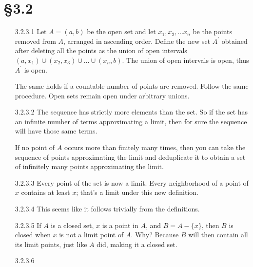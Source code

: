 \newpage
\vspace*{0.1cm}
\section*{\S 3.2}
\begin{enumerate}
\item[3.2.3.1]
  Let $A=(a, b)$ be the open set and let 
  $x_1, x_2, \ldots x_n$ be the points removed from $A$,
  arranged in ascending order. 
  Define the new set $A^\prime$ obtained
  after deleting all the points as the union of open intervals
  $(a, x_1) \cup (x_2, x_3) \cup \ldots \cup (x_n, b)$. 
  The union of open intervals is open, thus $A^\prime$ is open.

  The same holds if a countable number of points are removed. 
  Follow the same procedure. Open sets remain open under arbitrary unions. 
\item[]
\item[3.2.3.2]
  The sequence has strictly more elements than the set. 
  So if the set has an infinite number of terms approximating a limit, 
  then for sure the sequence will have those same terms.

  If no point of $A$ occurs more than finitely many times, 
  then you can take the sequence of points approximating the limit and
  deduplicate it to obtain a set of infinitely many points 
  approximating the limit. 
\item[]
\item[3.2.3.3]
  Every point of the set is now a limit. Every neighborhood of a point of $x$
  contains at least $x$; that's a limit under this new definition.
\item[]
\item[3.2.3.4]
  This seems like it follows trivially from the definitions. 
\item[]
\item[3.2.3.5]
  If $A$ is a closed set, $x$ is a point in $A$, and $B = A - \{ x \}$, 
  then $B$ is closed when $x$ is not a limit point of $A$. Why?
  Because $B$ will then contain all its limit points, just like $A$
  did, making it a closed set. 
\item[]
\item[3.2.3.6]
  

\end{enumerate}
